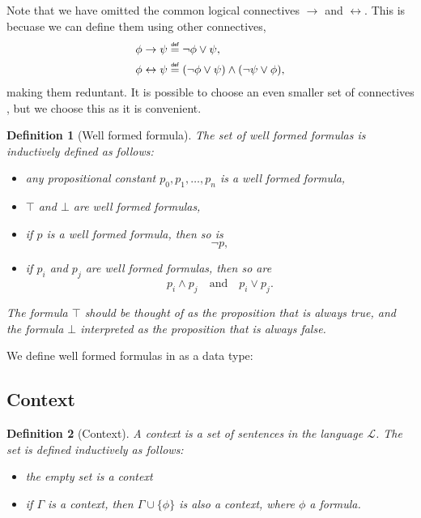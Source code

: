 \documentclass[titlepage]{article}
\newcommand\myeq{\mathrel{\overset{\makebox[0pt]{\mbox{\normalfont\tiny\sffamily def}}}{=}}}
\newtheorem{definition}{Definition}[section]
\begin{document}
Note that we have omitted the common logical connectives $\rightarrow$ and $\leftrightarrow$. This is becuase we can define them using other connectives, 
\begin{align*}
    \phi \rightarrow \psi &\myeq \neg \phi \vee \psi, \\
    \phi \leftrightarrow \psi &\myeq (\neg \phi \vee \psi) \wedge (\neg \psi \vee \phi),
\end{align*}making them reduntant. It is possible to choose an even smaller set of connectives \cite{vanDalen}, but we choose this as it is convenient.

\begin{definition}[Well formed formula]\label{wellformed}
    The set of well formed formulas is inductively defined as follows:
    \begin{itemize}
        \item any propositional constant $p_0,p_1,\hdots,p_n$ is a well formed formula,
        \item $\top$ and $\bot$ are well formed formulas,
        \item if $p$ is a well formed formula, then so is
        $$\neg p,$$
        \item if $p_i$ and $p_j$ are well formed formulas, then so are
            $$p_i \wedge p_j \quad \text{and} \quad p_i \vee p_j.$$
    \end{itemize}
    The formula $\top$ should be thought of as the proposition that is always true, and the formula $\bot$ interpreted as the proposition that is always false.
\end{definition}

We define well formed formulas in \Agda as a data type:




\subsection{Context}

\begin{definition}[Context]
    A context is a set of sentences in the language $\mathcal{L}$. The set is defined inductively as follows:
    \begin{itemize}
        \item the empty set is a context
        \item if $\Gamma$ is a context, then $\Gamma \cup \{\phi\}$ is also a context, where $\phi$ a formula.
    \end{itemize}
\end{definition}
\end{document}
